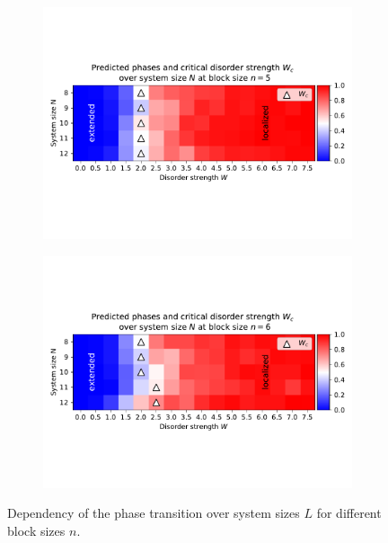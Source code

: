 \documentclass[reprint,amsmath,amssymb,aps,prb]{revtex4-2}
\begin{document}
\begin{center}
\begin{figure}[H]
\begin{subfigure}[c]{0.4\textwidth}
			\includegraphics[width=\textwidth]{../results/Wc/n5_Wc_N_dependency.pdf}
		\end{subfigure}
		\begin{subfigure}[c]{0.4\textwidth}
			\includegraphics[width=\textwidth]{../results/Wc/n6_Wc_N_dependency.pdf}
		\end{subfigure}
		\caption{Dependency of the phase transition over system sizes $L$ for different block sizes $n$.}
		\label{fig:wcextract}
	\end{figure}
\end{center}
\twocolumngrid%

\end{document}
